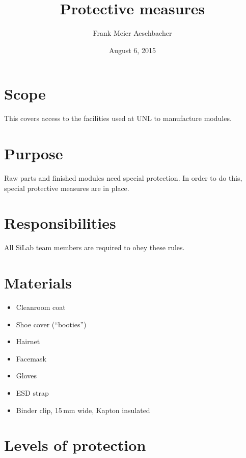 \documentclass[12pt]{unlsilabsop}
\title{Protective measures}
\date{August 6, 2015}
\author{Frank Meier Aeschbacher}
\begin{document}
\maketitle

\section{Scope}
This covers access to the facilities used at UNL to manufacture modules.

\section{Purpose}
Raw parts and finished modules need special protection. In order to do this, special protective measures are in place.


\section{Responsibilities}
All SiLab team members are required to obey these rules.

\section{Materials}
\begin{itemize}
    \item Cleanroom coat
    \item Shoe cover (``booties'')
    \item Hairnet
    \item Facemask
    \item Gloves
    \item ESD strap
    \item Binder clip, 15\,mm wide, Kapton insulated
\end{itemize}

\section{Levels of protection}
\end{document}
